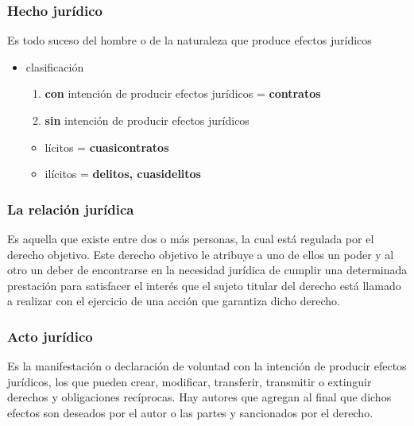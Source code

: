 \documentclass[]{article}
\providecommand{\tightlist}{%
  \setlength{\itemsep}{0pt}\setlength{\parskip}{0pt}}
\begin{document}
\hypertarget{hecho-juruxeddico}{%
\subsubsection{Hecho jurídico}\label{hecho-juruxeddico}}

Es todo suceso del hombre o de la naturaleza que produce efectos
jurídicos

\begin{itemize}
\tightlist
\item
  clasificación

  \begin{enumerate}
  \def\labelenumi{\arabic{enumi}.}
  \tightlist
  \item
    \textbf{con} intención de producir efectos jurídicos =
    \textbf{contratos}
  \item
    \textbf{sin} intención de producir efectos jurídicos
  \end{enumerate}

  \begin{itemize}
  \tightlist
  \item
    lícitos = \textbf{cuasicontratos}
  \item
    ilícitos = \textbf{delitos, cuasidelitos}
  \end{itemize}
\end{itemize}

\hypertarget{la-relaciuxf3n-juruxeddica}{%
\subsubsection{La relación jurídica}\label{la-relaciuxf3n-juruxeddica}}

Es aquella que existe entre dos o más personas, la cual está regulada
por el derecho objetivo. Este derecho objetivo le atribuye a uno de
ellos un poder y al otro un deber de encontrarse en la necesidad
jurídica de cumplir una determinada prestación para satisfacer el
interés que el sujeto titular del derecho está llamado a realizar con el
ejercicio de una acción que garantiza dicho derecho.

\hypertarget{acto-juruxeddico-1}{%
\subsubsection{Acto jurídico}\label{acto-juruxeddico-1}}

Es la manifestación o declaración de voluntad con la intención de
producir efectos jurídicos, los que pueden crear, modificar, transferir,
transmitir o extinguir derechos y obligaciones recíprocas. Hay autores
que agregan al final que dichos efectos son deseados por el autor o las
partes y sancionados por el derecho.
\end{document}
